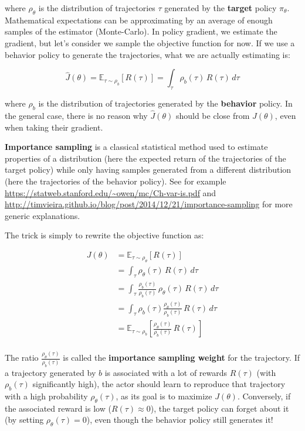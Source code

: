 \documentclass[
  letterpaper,
  DIV=11,
  numbers=noendperiod]{scrreprt}
\begin{document}
where \(\rho_\theta\) is the distribution of trajectories \(\tau\)
generated by the \textbf{target} policy \(\pi_\theta\). Mathematical
expectations can be approximating by an average of enough samples of the
estimator (Monte-Carlo). In policy gradient, we estimate the gradient,
but let's consider we sample the objective function for now. If we use a
behavior policy to generate the trajectories, what we are actually
estimating is:

\[
    \hat{J}(\theta) = \mathbb{E}_{\tau \sim \rho_b}[R(\tau)] = \int_\tau \rho_b(\tau) \, R(\tau) \, d\tau
\]

where \(\rho_b\) is the distribution of trajectories generated by the
\textbf{behavior} policy. In the general case, there is no reason why
\(\hat{J}(\theta)\) should be close from \(J(\theta)\), even when taking
their gradient.

\textbf{Importance sampling} is a classical statistical method used to
estimate properties of a distribution (here the expected return of the
trajectories of the target policy) while only having samples generated
from a different distribution (here the trajectories of the behavior
policy). See for example
\url{https://statweb.stanford.edu/~owen/mc/Ch-var-is.pdf} and
\url{http://timvieira.github.io/blog/post/2014/12/21/importance-sampling}
for more generic explanations.

The trick is simply to rewrite the objective function as:

\[
\begin{aligned}
    J(\theta) & = \mathbb{E}_{\tau \sim \rho_\theta}[R(\tau)]  \\
              & = \int_\tau \rho_\theta(\tau) \, R(\tau) \, d\tau \\
              & = \int_\tau \frac{\rho_b(\tau)}{\rho_b(\tau)} \, \rho_\theta(\tau) \, R(\tau) \, d\tau \\
              & = \int_\tau \rho_b(\tau) \frac{\rho_\theta(\tau)}{\rho_b(\tau)} \, R(\tau) \, d\tau \\
              & = \mathbb{E}_{\tau \sim \rho_b}[\frac{\rho_\theta(\tau)}{\rho_b(\tau)} \, R(\tau)]  \\
\end{aligned}
\]

The ratio \(\frac{\rho_\theta(\tau)}{\rho_b(\tau)}\) is called the
\textbf{importance sampling weight} for the trajectory. If a trajectory
generated by \(b\) is associated with a lot of rewards \(R(\tau)\) (with
\(\rho_b(\tau)\) significantly high), the actor should learn to
reproduce that trajectory with a high probability \(\rho_\theta(\tau)\),
as its goal is to maximize \(J(\theta)\). Conversely, if the associated
reward is low (\(R(\tau)\approx 0\)), the target policy can forget about
it (by setting \(\rho_\theta(\tau) = 0\)), even though the behavior
policy still generates it!
\end{document}
